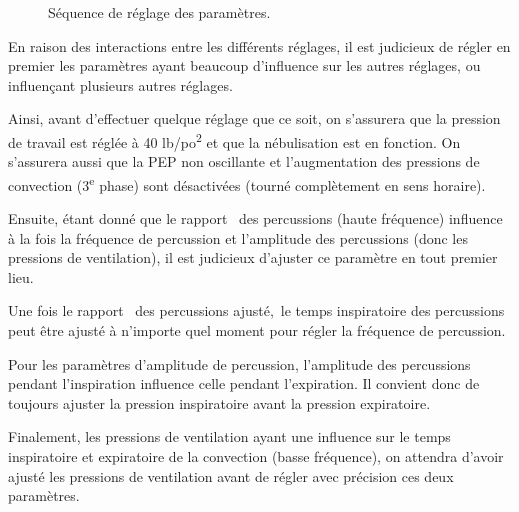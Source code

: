 \begin{figure*}
	
	\caption{Séquence de réglage des paramètres.}
\end{figure*}

En raison des interactions entre les différents réglages, il est
judicieux de régler en premier les paramètres ayant beaucoup d'influence
sur les autres réglages, ou influençant plusieurs autres réglages.

Ainsi, avant d'effectuer quelque réglage que ce soit, on s'assurera que
la pression de travail est réglée à 40 lb/po\textsuperscript{2} et que la nébulisation est
en fonction. On s'assurera aussi que la PEP non oscillante et
l'augmentation des pressions de convection (3\textsuperscript{e} phase) sont désactivées
(tourné complètement en sens horaire).

Ensuite, étant donné que le rapport \ie\ des percussions (haute
fréquence) influence à la fois la fréquence de percussion et l'amplitude
des percussions (donc les pressions de ventilation), il est judicieux
d'ajuster ce paramètre en tout premier lieu.

Une fois le rapport \ie\ des percussions ajusté,~le temps inspiratoire
des percussions peut être ajusté à n'importe quel moment pour régler la
fréquence de percussion.

Pour les paramètres d'amplitude de percussion, l'amplitude des
percussions pendant l'inspiration influence celle pendant l'expiration.
Il convient donc de toujours ajuster la pression inspiratoire avant la
pression expiratoire.

Finalement, les pressions de ventilation ayant une influence sur le
temps inspiratoire et expiratoire de la convection (basse fréquence),
on attendra d'avoir ajusté les pressions de ventilation avant de régler
avec précision ces deux paramètres.
